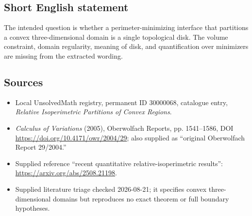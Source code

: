 \documentclass[11pt]{article}
\begin{document}
\subsection{Short English statement}
The intended question is whether a perimeter-minimizing interface that partitions a convex three-dimensional domain is a single topological disk. The volume constraint, domain regularity, meaning of disk, and quantification over minimizers are missing from the extracted wording.
\subsection{Sources}
\begin{itemize}
\item Local UnsolvedMath registry, permanent ID 30000068, catalogue entry, \emph{Relative Isoperimetric Partitions of Convex Regions}.
\item \emph{Calculus of Variations} (2005), Oberwolfach Reports, pp. 1541--1586, DOI \url{https://doi.org/10.4171/owr/2004/29}; also supplied as ``original Oberwolfach Report 29/2004.''
\item Supplied reference ``recent quantitative relative-isoperimetric results'': \url{https://arxiv.org/abs/2508.21198}.
\item Supplied literature triage checked 2026-08-21; it specifies convex three-dimensional domains but reproduces no exact theorem or full boundary hypotheses.
\end{itemize}
\end{document}
